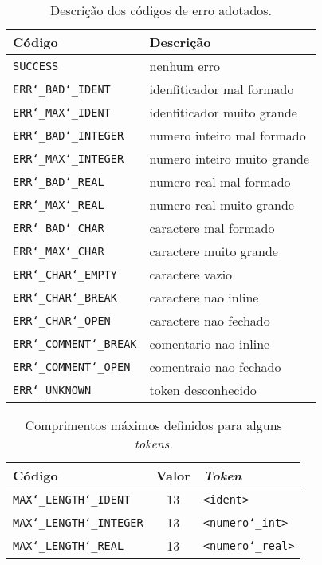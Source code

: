 \begin{table}[h]
\begin{center}
	\begin{tabular}{|l||l|} 
		\hline
		\textbf{Código}                        & \textbf{Descrição}\\
		\hline
		\texttt{SUCCESS}                       &       nenhum erro\\
		\texttt{ERR\char`_BAD\char`_IDENT}     & idenfiticador mal formado\\
		\texttt{ERR\char`_MAX\char`_IDENT}     & idenfiticador muito grande\\
		\texttt{ERR\char`_BAD\char`_INTEGER}   & numero inteiro mal formado\\
		\texttt{ERR\char`_MAX\char`_INTEGER}   & numero inteiro muito grande\\
		\texttt{ERR\char`_BAD\char`_REAL}      & numero real mal formado\\
		\texttt{ERR\char`_MAX\char`_REAL}      & numero real muito grande\\
		\texttt{ERR\char`_BAD\char`_CHAR}      & caractere mal formado\\
		\texttt{ERR\char`_MAX\char`_CHAR}      & caractere muito grande\\
		\texttt{ERR\char`_CHAR\char`_EMPTY}    & caractere vazio\\
		\texttt{ERR\char`_CHAR\char`_BREAK}    & caractere nao inline\\
		\texttt{ERR\char`_CHAR\char`_OPEN}     & caractere nao fechado\\
		\texttt{ERR\char`_COMMENT\char`_BREAK} & comentario nao inline\\
		\texttt{ERR\char`_COMMENT\char`_OPEN}  & comentraio nao fechado\\
		\texttt{ERR\char`_UNKNOWN}             &    token desconhecido\\
		\hline
	\end{tabular}
	\caption{Descrição dos códigos de erro adotados\label{tab:erros}.}
\end{center}
\end{table}

\begin{table}[h]
\begin{center}
	\begin{tabular}{|l||c|l|} 
		\hline
		\textbf{Código}                     & \textbf{Valor}  & \textbf{\textit{Token}}\\
		\hline
	\texttt{MAX\char`_LENGTH\char`_IDENT}   & 13      & \texttt{<ident>}\\
	\texttt{MAX\char`_LENGTH\char`_INTEGER} & 13      & \texttt{<numero\char`_int>}\\
	\texttt{MAX\char`_LENGTH\char`_REAL}    & 13      & \texttt{<numero\char`_real>}\\
		\hline
	\end{tabular}
	\caption{Comprimentos máximos definidos para alguns \textit{tokens}\label{tab:comprimentos}.}
\end{center}
\end{table}
